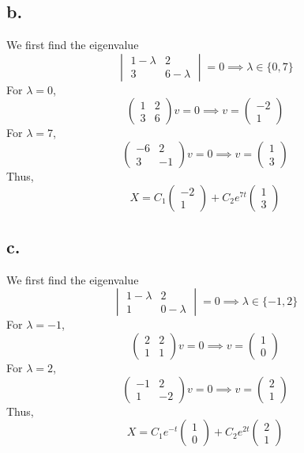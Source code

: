 \documentclass[11pt]{article}
\theoremstyle{mystyle}
\theoremstyle{definition}
\begin{document}
\subsection*{b.}
We first find the eigenvalue 
\[
  \begin{vmatrix}
    1 - \lambda & 2 \\
    3 & 6 - \lambda
  \end{vmatrix}
  = 0 \implies \lambda \in \{0,7\} 
\]
For $\lambda = 0$, 
\[
  \begin{pmatrix}
    1 & 2 \\
    3 & 6
  \end{pmatrix}
  v
  = 0 \implies
  v = 
  \begin{pmatrix}
    -2 \\
    1
  \end{pmatrix}
\]
For $\lambda = 7$, 
\[
  \begin{pmatrix}
    -6 & 2 \\
    3 & -1
  \end{pmatrix}
  v
  = 0 \implies
  v = 
  \begin{pmatrix}
    1 \\
    3
  \end{pmatrix}
\]
Thus, 
\[
  X = C_1 
  \begin{pmatrix}
    -2 \\
    1
  \end{pmatrix}
  + 
  C_2 e^{7t} 
  \begin{pmatrix}
    1 \\
    3
  \end{pmatrix}
\]
\subsection*{c.}
We first find the eigenvalue 
\[
  \begin{vmatrix}
    1 -\lambda & 2 \\
    1 & 0 - \lambda
  \end{vmatrix}
  = 0 \implies \lambda \in \{-1,2\} 
\]
For $\lambda = -1$, 
\[
  \begin{pmatrix}
    2 & 2 \\
    1 & 1
  \end{pmatrix}
  v
  = 0 \implies
  v = 
  \begin{pmatrix}
    1 \\
    0
  \end{pmatrix}
\]
For $\lambda = 2$, 
\[
  \begin{pmatrix}
    -1 & 2 \\
    1 & -2
  \end{pmatrix}
  v
  = 0 \implies
  v = 
  \begin{pmatrix}
    2 \\
    1
  \end{pmatrix}
\]
Thus, 
\[
  X = C_1 e^{-t} 
  \begin{pmatrix}
    1 \\
    0
  \end{pmatrix}
  + 
  C_2 e^{2t} 
  \begin{pmatrix}
    2 \\
    1
  \end{pmatrix}
\]
\end{document}
